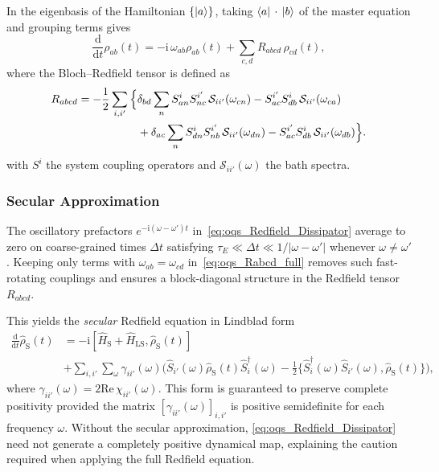 In the eigenbasis of the Hamiltonian $\{\ket{a}\}$, taking $\bra{a}\,\cdot\,\ket{b}$ of the master equation and grouping terms gives
\begin{equation*}
	\frac{\mathrm{d}}{\mathrm{d}t}\rho_{ab}(t)
	= -\mathrm{i}\,\omega_{ab}\rho_{ab}(t) + \sum_{c,d} R_{abcd}\,\rho_{cd}(t),
\end{equation*}
where the Bloch--Redfield tensor is defined as
\begin{align}
	R_{abcd}
	= -\frac{1}{2} \sum_{i, i'}\Big\{ &
	\delta_{bd}\sum_n S^{i}_{an}S^{i'}_{nc}\,\mathcal{S}_{ii'}(\omega_{cn})
	- S^{i'}_{ac}S^{i}_{db}\,\mathcal{S}_{ii'}(\omega_{ca})
	\notag                                                                                                       \\
	                                  & +\delta_{ac}\sum_n S^{i}_{dn}S^{i'}_{nb}\,\mathcal{S}_{ii'}(\omega_{dn})
	- S^{i'}_{ac}S^{i}_{db}\,\mathcal{S}_{ii'}(\omega_{db})
	\Big\}.
	\label{eq:oqs_Rabcd_full}
\end{align}
with $S^{i}$ the system coupling operators and $\mathcal{S}_{ii'}(\omega)$ the bath spectra\cite{lambertetal2026qutip5quantum}.


\subsubsection{Secular Approximation}

The oscillatory prefactors $e^{-\mathrm{i}(\omega - \omega') t}$ in~\autoref{eq:oqs_Redfield_Dissipator} average to zero on coarse-grained times $\Delta t$ satisfying $\tau_E \ll \Delta t \ll 1/|\omega - \omega'|$ whenever $\omega \neq \omega'$.
Keeping only terms with $\omega_{ab}=\omega_{cd}$ in~\autoref{eq:oqs_Rabcd_full} removes such fast-rotating couplings and ensures a block-diagonal structure in the Redfield tensor $R_{abcd}$.

This yields the \emph{secular} Redfield equation in Lindblad form
\begin{align*}
	\frac{\mathrm{d}}{\mathrm{d}t}\hat{\rho}_{\mathrm{S}}(t) & = -\mathrm{i} [\hat{H}_{\mathrm{S}} + \hat{H}_{\mathrm{LS}}, \hat{\rho}_{\mathrm{S}}(t)]                                                                                                                                                               \\
	                            & + \sum_{i,i'} \sum_{\omega} \gamma_{ii'}(\omega) \Big( \hat{S}_{i'}(\omega) \hat{\rho}_{\mathrm{S}}(t) \hat{S}_i^{\dagger}(\omega) - \tfrac{1}{2} \{ \hat{S}_i^{\dagger}(\omega) \hat{S}_{i'}(\omega), \hat{\rho}_{\mathrm{S}}(t) \} \Big),
\end{align*}
where $\gamma_{ii'}(\omega) = 2 \mathrm{Re}\,\chi_{ii'}(\omega)$. This form is guaranteed to preserve complete positivity provided the matrix $[\gamma_{ii'}(\omega)]_{i,i'}$ is positive semidefinite for each frequency $\omega$. Without the secular approximation, \autoref{eq:oqs_Redfield_Dissipator} need not generate a completely positive dynamical map, explaining the caution required when applying the full Redfield equation.

